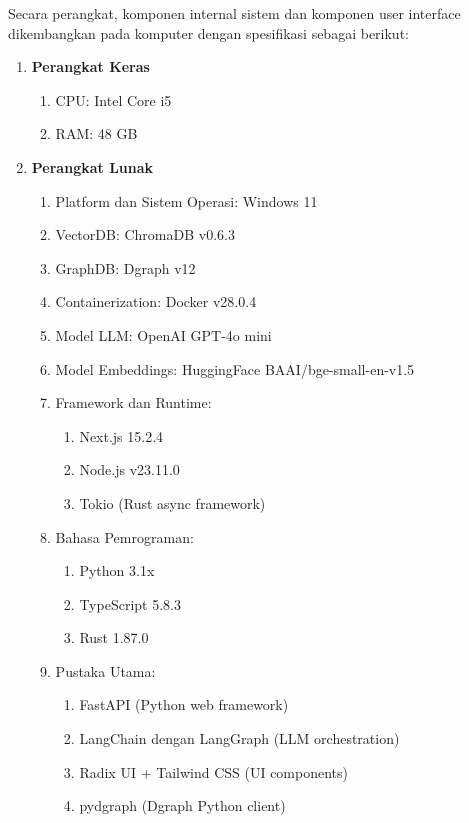 Secara perangkat, komponen internal sistem dan komponen user interface dikembangkan pada komputer dengan spesifikasi sebagai berikut:
\begin{enumerate}
	\item \textbf{Perangkat Keras}
	      \begin{enumerate}
		      \item CPU: Intel Core i5
		      \item RAM: 48 GB
	      \end{enumerate}
	\item \textbf{Perangkat Lunak}
	      \begin{enumerate}
		      \item Platform dan Sistem Operasi: Windows 11
		      \item VectorDB: ChromaDB v0.6.3
		      \item GraphDB: Dgraph v12
		      \item Containerization: Docker v28.0.4
		      \item Model LLM: OpenAI GPT-4o mini
		      \item Model Embeddings: HuggingFace BAAI/bge-small-en-v1.5
		      \item Framework dan Runtime:
		            \begin{enumerate}
			            \item Next.js 15.2.4
			            \item Node.js v23.11.0
			            \item Tokio (Rust async framework)
		            \end{enumerate}
		      \item Bahasa Pemrograman:
		            \begin{enumerate}
			            \item Python 3.1x
			            \item TypeScript 5.8.3
			            \item Rust 1.87.0
		            \end{enumerate}
		      \item Pustaka Utama:
		            \begin{enumerate}
			            \item FastAPI (Python web framework)
			            \item LangChain dengan LangGraph (LLM orchestration)
			            \item Radix UI + Tailwind CSS (UI components)
			            \item pydgraph (Dgraph Python client)
		            \end{enumerate}
	      \end{enumerate}
\end{enumerate}